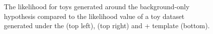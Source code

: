 \begin{figure}[h!]
\caption{The likelihood for toys generated around the background-only hypothesis compared to the likelihood value of a toy dataset generated under the \PYTHIA (top left), \HERWIG{++} (top right) and \MADGRAPH{}+ template (bottom).}
\label{fig:gof}
\end{figure}
